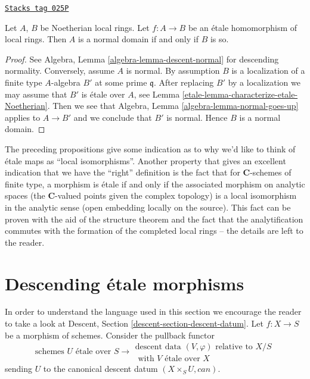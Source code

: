 \begin{proposition}
\label{etale-proposition-etale-normal}
\href{https://stacks.math.columbia.edu/tag/025P}{\texttt{Stacks tag 025P}}

\begin{reference}
\cite[Expose I, Theorem 9.5 part (i)]{SGA1}
\end{reference}
Let $A$, $B$ be Noetherian local rings.
Let $f : A \to B$ be an \'etale homomorphism of local rings.
Then $A$ is a normal domain if and only if $B$ is so.
\end{proposition}

\begin{proof}

See
Algebra, Lemma \ref{algebra-lemma-descent-normal}
for descending normality. Conversely, assume $A$ is normal.
By assumption $B$ is a localization of a finite type $A$-algebra
$B'$ at some prime $\mathfrak q$. After replacing $B'$ by a localization
we may assume that $B'$ is \'etale over $A$, see
Lemma \ref{etale-lemma-characterize-etale-Noetherian}.
Then we see that
Algebra, Lemma \ref{algebra-lemma-normal-goes-up}
applies to $A \to B'$ and we conclude that $B'$ is normal.
Hence $B$ is a normal domain.
\end{proof}

The preceding propositions give some indication as to why we'd like to think
of \'etale maps as ``local isomorphisms''. Another property that gives an
excellent indication that we have the ``right'' definition is the fact that
for $\mathbf{C}$-schemes of finite type, a morphism is \'etale if and only if
the associated morphism on analytic spaces (the $\mathbf{C}$-valued points given
the complex topology) is a local isomorphism in the analytic sense (open
embedding locally on the source). This fact can be proven with the aid of the
structure theorem and the fact that the analytification commutes with the
formation of the completed local rings -- the details are left to the reader.

\section{Descending \'etale morphisms}
\label{etale-section-descending-etale}
In order to understand the language used in this section we encourage
the reader to take a look at
Descent, Section \ref{descent-section-descent-datum}.
Let $f : X \to S$ be a morphism of schemes. Consider the
pullback functor
\begin{equation}
\label{equation-descent-etale}
\text{schemes }U\text{ \'etale over }S \longrightarrow
\begin{matrix}
\text{descent data }(V, \varphi)\text{ relative to }X/S \\
\text{ with }V\text{ \'etale over }X
\end{matrix}
\end{equation}
sending $U$ to the canonical descent datum $(X \times_S U, can)$.

